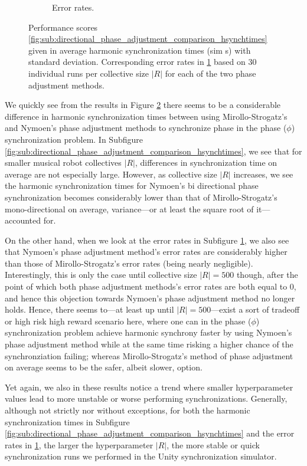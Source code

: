 \begin{figure}[ht!]
\begin{subfigure}[b]{0.5\textwidth}
			\caption{Error rates.}
			\label{fig:sub:directional_phase_adjustment_comparison_errorrates}
		  \end{subfigure}
		  \caption{Performance scores \ref{fig:sub:directional_phase_adjustment_comparison_hsynchtimes} given in average harmonic synchronization times (sim s) with standard deviation. Corresponding error rates in \ref{fig:sub:directional_phase_adjustment_comparison_errorrates} based on 30 individual runs per collective size $|R|$ for each of the two phase adjustment methods.}
		  \label{fig:directional_phase_adjustment_comparison}
		\end{figure}
		
		We quickly see from the results in Figure \ref{fig:directional_phase_adjustment_comparison} there seems to be a considerable difference in harmonic synchronization times between using Mirollo-Strogatz's and Nymoen's phase adjustment methods to synchronize phase in the phase ($\phi$) synchronization problem. In Subfigure \ref{fig:sub:directional_phase_adjustment_comparison_hsynchtimes}, we see that for smaller musical robot collectives $|R|$, differences in synchronization time on average are not especially large. However, as collective size $|R|$ increases, we see the harmonic synchronization times for Nymoen's bi directional phase synchronization becomes considerably lower than that of Mirollo-Strogatz's mono-directional on average, variance—or at least the square root of it—accounted for.
		
		On the other hand, when we look at the error rates in Subfigure \ref{fig:sub:directional_phase_adjustment_comparison_errorrates}, we also see that Nymoen's phase adjustment method's error rates are considerably higher than those of Mirollo-Strogatz's error rates (being nearly negligible). Interestingly, this is only the case until collective size $|R|=500$ though, after the point of which both phase adjustment methods's error rates are both equal to 0, and hence this objection towards Nymoen's phase adjustment method no longer holds. Hence, there seems to—at least up until $|R|=500$—exist a sort of tradeoff or high risk high reward scenario here, where one can in the phase ($\phi$) synchronization problem achieve harmonic synchrony faster by using Nymoen's phase adjustment method while at the same time risking a higher chance of the synchronziation failing; whereas Mirollo-Strogatz's method of phase adjustment on average seems to be the safer, albeit slower, option.
		
		Yet again, we also in these results notice a trend where smaller hyperparameter values lead to more unstable or worse performing synchronizations. Generally, although not strictly nor without exceptions, for both the harmonic synchronization times in Subfigure \ref{fig:sub:directional_phase_adjustment_comparison_hsynchtimes} and the error rates in \ref{fig:sub:directional_phase_adjustment_comparison_errorrates}, the larger the hyperparameter $|R|$, the more stable or quick synchronization runs we performed in the Unity synchronization simulator. 
		
